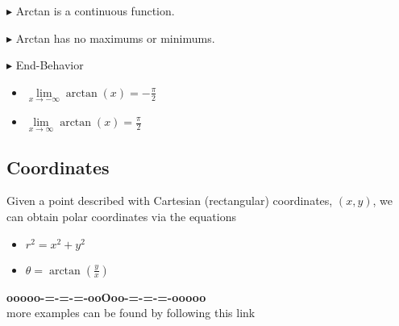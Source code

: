 \documentclass{ximera}
\begin{document}
$\blacktriangleright$ Arctan is a continuous function.

$\blacktriangleright$ Arctan has no maximums or minimums.


$\blacktriangleright$ End-Behavior





\begin{itemize}
  \item $\lim\limits_{x \to -\infty} \arctan(x) = -\frac{\pi}{2}$
  \item $\lim\limits_{x \to \infty} \arctan(x) = \frac{\pi}{2}$
\end{itemize}










\subsection*{Coordinates} 

Given a point described with Cartesian (rectangular) coordinates, $(x, y)$, we can obtain polar coordinates via the equations


\begin{itemize}
\item $r^2 = x^2 + y^2$
\item $\theta = \arctan\left( \frac{y}{x} \right)$
\end{itemize}











\begin{center}
\textbf{\textcolor{green!50!black}{ooooo-=-=-=-ooOoo-=-=-=-ooooo}} \\

more examples can be found by following this link\\ 

\end{center}
\end{document}
